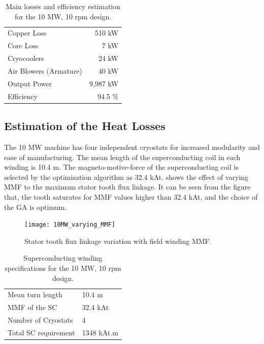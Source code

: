 \documentclass[final,peerreview,onecolumn]{IEEEtran}
\begin{document}
\begin{table}[t]
  \centering
  \begin{tabular}{lr}
\hline
Copper Loss & 510 kW \\
Core Loss & 7 kW \\
Cryocoolers & 24 kW \\
Air Blowers (Armature) & 40 kW \\
Output Power & 9,987 kW \\
\hline
Efficiency & 94.5 \% \\
\hline
\end{tabular}
  \caption{Main losses and efficiency estimation for the 10 MW, 10 rpm design.}
  \label{10MW_efficiency}
\end{table}

\subsection{Estimation of the Heat Losses}

The 10 MW machine has four independent cryostats for increased modularity and ease of manufacturing. The mean length of the superconducting coil in each winding is 10.4 m. The magneto-motive-force of the superconducting coil is selected by the optimisation algorithm as 32.4 kAt.  shows the effect of varying MMF to the maximum stator tooth flux linkage. It can be seen from the figure that, the tooth saturates for MMF values higher than 32.4 kAt, and the choice of the GA is optimum.


\begin{figure}[t]
  \centering
    \texttt{[image: 10MW\_varying\_MMF]}
  \caption{Stator tooth flux linkage variation with field winding MMF.}
  \label{10MW_varying_MMF}
\end{figure}

\begin{table}[t]
  \centering
  \begin{tabular}{ll}
\hline
Mean turn length & 10.4 m \\
MMF of the SC & 32.4 kAt \\
Number of Cryostats & 4 \\
Total SC requirement & 1348 kAt.m \\
\hline
 \end{tabular}
  \caption{Superconducting winding specifications for the 10 MW, 10 rpm design.}
  \label{10MW_hts_spec}
\end{table}
\end{document}
